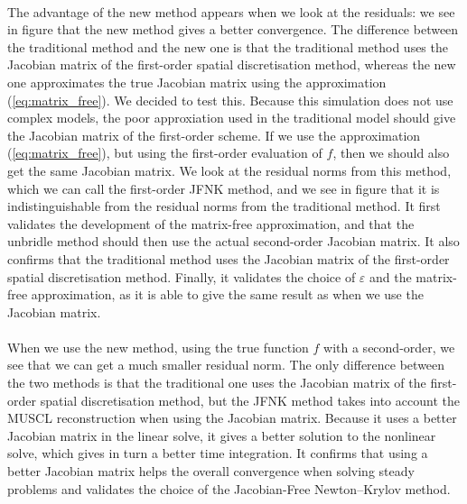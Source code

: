         \paragraph{}
        The advantage of the new method appears when we look at the residuals: we see in figure  that the new method gives a better convergence.
        The difference between the traditional method and the new one is that the traditional method uses the Jacobian matrix of the first-order spatial discretisation method, whereas the new one approximates the true Jacobian matrix using the approximation (\ref{eq:matrix_free}).
        We decided to test this.
        Because this simulation does not use complex models, the poor approxiation used in the traditional model should give the Jacobian matrix of the first-order scheme.
        If we use the approximation (\ref{eq:matrix_free}), but using the first-order evaluation of $f$, then we should also get the same Jacobian matrix.
        We look at the residual norms from this method, which we can call the first-order JFNK method, and we see in figure  that it is indistinguishable from the residual norms from the traditional method.
        It first validates the development of the matrix-free approximation, and that the unbridle method should then use the actual second-order Jacobian matrix.
        It also confirms that the traditional method uses the Jacobian matrix of the first-order spatial discretisation method.
        Finally, it validates the choice of $\varepsilon$ and the matrix-free approximation, as it is able to give the same result as when we use the Jacobian matrix.

        \paragraph{}
        When we use the new method, using the true function $f$ with a second-order, we see that we can get a much smaller residual norm.
        The only difference between the two methods is that the traditional one uses the Jacobian matrix of the first-order spatial discretisation method, but the JFNK method takes into account the MUSCL reconstruction when using the Jacobian matrix.
        Because it uses a better Jacobian matrix in the linear solve, it gives a better solution to the nonlinear solve, which gives in turn a better time integration.
        It confirms that using a better Jacobian matrix helps the overall convergence when solving steady problems and validates the choice of the Jacobian-Free Newton--Krylov method.


